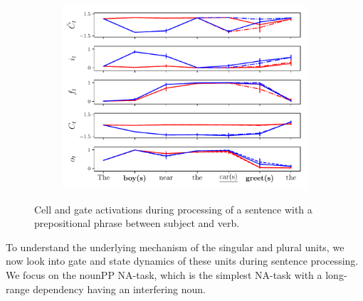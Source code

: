 \begin{figure}[ht]
\begin{subfigure}{0.32\textwidth}
    \label{fig:singular-unit}
    \end{subfigure}
    \begin{subfigure}{0.32\textwidth}
            \centering
            \includegraphics[width=\linewidth]{Figures/nounpp_775.pdf}
    \label{fig:plural-unit}
    \end{subfigure}
\caption{Cell and gate activations during processing of a sentence with a prepositional phrase between subject and verb.}
\end{figure}

To understand the underlying mechanism of the singular and plural units, we now look into gate and state dynamics of these units during sentence processing. We focus on the nounPP NA-task, which is the simplest NA-task with a long-range dependency having an interfering noun. 

